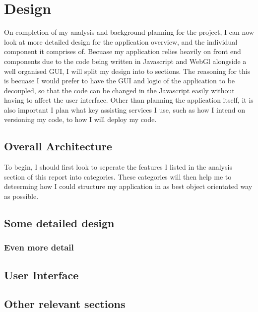 \chapter{Design}
On completion of my analysis and background planning for the project, I can now look at more detailed design for the application overview, and the individual component it comprises of. Becuase my application relies heavily on front end components due to the code being written in Javascript and WebGl alongside a well organised GUI, I will split my design into to sections. The reasoning for this is becuase I would prefer to have the GUI and logic of the application to be decoupled, so that the code can be changed in the Javascript easily without having to affect the user interface. Other than planning the application itself, it is also important I plan what key assisting services I use, such as how I intend on versioning my code, to how I will deploy my code.

\section{Overall Architecture}
To begin, I should first look to seperate the features I listed in the analysis section of this report into categories. These categories will then help me to deteerming how I could structure my application in as best object orientated way as possible.

\section{Some detailed design}

\subsection{Even more detail}

\section{User Interface}

\section{Other relevant sections}

